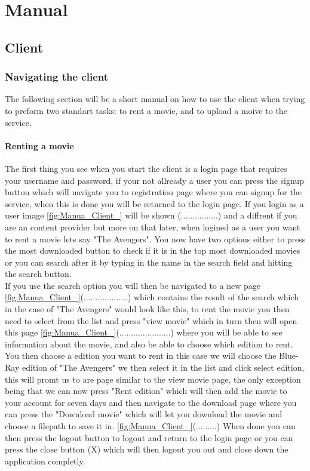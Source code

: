 \chapter{Manual}
\label{Manual}

\section{Client}
\label{Manual_Client}

\subsection{Navigating the client}
\label{Manual_Client_Navigation}
The following section will be a short manual on how to use the client when trying to preform two standart tasks: to rent a movie, and to upload a moive to the service.

\subsubsection{Renting a movie}
\label{Manual_Client_Navigation_Rent}
The first thing you see when you start the client is a login page that requires your username and password, if your not allready a user you can press the signup button which will navigate you to registration page where you can signup for the service, when this is done you will be returned to the login page. If you login as a user image \ref{fig:Manua_Client_} will be shown (................) and a diffrent if you are an content provider but more on that later, when logined as a user you want to rent a movie lets say "The Avengers". You now have two options either to press the most downloaded button to check if it is in the top most downloaded movies or you can search after it by typing in the name in the search field and hitting the search button.
\\If you use the search option you will then be navigated to a new page \ref{fig:Manua_Client_}(...................) which contains the result of the search which in the case of "The Avengers" would look like this, to rent the movie you then need to select from the list and press "view movie" which in turn then will open this page \ref{fig:Manua_Client_}(......................) where you will be able to see information about the movie, and also be able to choose which edition to rent.
\\ You then choose a edition you want to rent in this case we will choose the Blue-Ray edition of "The Avengers" we then select it in the list and click select edition, this will promt us to are page similar to the view movie page, the only exception being that we can now press "Rent edition" which will then add the movie to your account for seven days and then navigate to the download page where you can press the "Download movie" which will let you download the movie and choose a filepath to save it in. \ref{fig:Manua_Client_}(.........) When done you can then press the logout button to logout and return to the login page or you can press the close button (X) which will then logout you out and close down the application completly.

